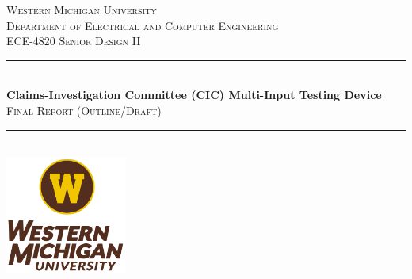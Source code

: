 \documentclass[12pt]{article}
\begin{document}
\begin{titlepage}
    \newcommand{\HRule}{\rule{\linewidth}{0.5mm}} %
    
    \center %
    
    
    \textsc{\LARGE Western Michigan University}\\[0.5cm]
    \textsc{\Large Department of Electrical and Computer Engineering}\\[0.5cm] 
    \textsc{\large ECE-4820 Senior Design II}\\[0.5cm] 
    
    
    \HRule \\[0.4cm]
    { \huge \bfseries  Claims-Investigation Committee (CIC) Multi-Input Testing Device}\\[0.4cm]  
    \textsc{\Large Final Report (Outline/Draft)}\\[0.4cm] 
    \HRule \\[1.5cm]
    
    
    \includegraphics[width=0.3\textwidth]{../assets/WMU_Logo.png}\\[1cm]  
    

\end{titlepage}
\end{document}
